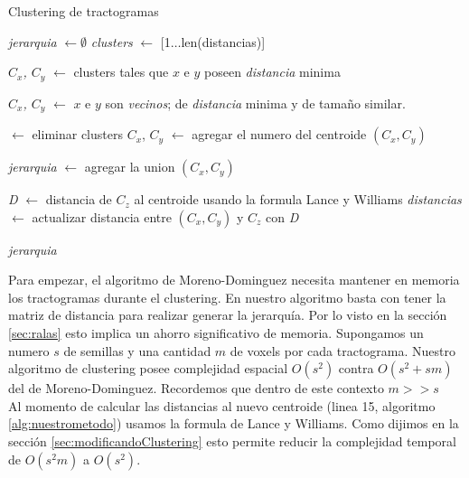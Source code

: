 \begin{algorithm}[h!]
\caption{Clustering de tractogramas}\label{alg:nuestrometodo}
\begin{algorithmic}[1]

                      
    \State \emph{jerarquia} $\gets \emptyset$
    \State \emph{clusters} $\gets$ [1$\dots$len(distancias)]                  
                      


        \State \emph{$C_x$, $C_y$} $\gets$ clusters tales que $x$ e $y$ poseen \emph{distancia} minima      
            
    \Else{}

        \State \emph{$C_x$, $C_y$} $\gets$ $x$ e $y$ son \emph{vecinos}; 
                                   de \emph{distancia} minima y de tama\~no similar.

    \EndIf
    
     $\gets$ eliminar clusters $C_x$, $C_y$
     $\gets$ agregar el numero del centroide $(C_x,C_y)$ 
                          
    \State \emph{jerarquia} $\gets$ agregar la union $(C_x,C_y)$
    
        \State \emph{D} $\gets$ distancia de $C_z$ al centroide usando la formula Lance y Williams
        \State \emph{distancias} $\gets$ actualizar distancia entre $(C_x,C_y)$ y $C_z$ con \emph{D}
    \EndFor            
    
\EndFor


\State \Return \emph{jerarquia} 
 
\EndProcedure 

\end{algorithmic}
\end{algorithm}

Para empezar, el algoritmo de Moreno-Dominguez necesita mantener en memoria los
tractogramas durante el clustering. En nuestro algoritmo basta con tener la matriz
de distancia para realizar generar la jerarqu\'ia. Por lo visto en la secci\'on
\ref{sec:ralas} esto implica un ahorro significativo de memoria. Supongamos un numero
$s$ de semillas y una cantidad $m$ de voxels por cada tractograma. Nuestro algoritmo
de clustering posee complejidad espacial $O(s^2)$ contra $O(s^2 + sm)$ del de
Moreno-Dominguez. Recordemos que dentro de este contexto $m >> s$ \\

Al momento de calcular las distancias al nuevo centroide (linea 15, algoritmo 
\ref{alg:nuestrometodo}) usamos la formula de Lance y Williams. Como dijimos en 
la secci\'on \ref{sec:modificandoClustering} esto permite reducir la complejidad
temporal de $O(s^2m)$ a $O(s^2)$.
\blankpage
